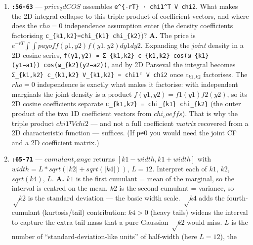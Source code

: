 \documentclass[
  11pt,
]{article}
\begin{document}
\begin{enumerate}
  strike couple \(y1\) and \(y2\) \emph{non-separably}: the region where
  the basket exceeds \(K\) is a diagonal half-plane
  \({w1 g1(y1)+w2 g2(y2) > K}\), not a product of intervals, so the 2D
  integral does not factor into a product of 1D integrals and has no
  elementary antiderivative. Hence line 49 builds the payoff on a dense
  grid \(P\) and lines 52--54 apply 2D trapezoidal quadrature written as
  \(C1ᵀ P C2\), where \(C1, C2\) are the cosine matrices times the
  trapezoidal weights \((Wy·h)\). It is the strike \(K\) inside the
  joint \(max\) that couples the two states.
\item
  \textbf{\texttt{:56-63}} --- \(price_2dCOS\) assembles
  \texttt{e\^{}\{-rT\}\ ·\ chi1\^{}T\ V\ chi2}. What makes the 2D
  integral collapse to this triple product of coefficient vectors, and
  where does the \(rho=0\) independence assumption enter (the density
  coefficients factorising
  \texttt{c\_\{k1,k2\}=chi\_\{k1\}\ chi\_\{k2\}})? \textbf{A.} The price
  is \(e^{−rT} ∫∫ payoff(y1,y2) f(y1,y2) dy1 dy2\). Expanding the
  \emph{joint} density in a 2D cosine series,
  \texttt{f(y1,y2)\ ≈\ Σ\_\{k1,k2\}\ c\_\{k1,k2\}\ cos(ω\_\{k1\}(y1−a1))\ cos(ω\_\{k2\}(y2−a2))},
  and by 2D Parseval the integral becomes
  \texttt{Σ\_\{k1,k2\}\ c\_\{k1,k2\}\ V\_\{k1,k2\}\ =\ chi1ᵀ\ V\ chi2}
  once \(c_{k1,k2}\) factorises. The \(rho=0\) independence is exactly
  what makes it factorise: with independent marginals the joint density
  is a product \(f(y1,y2)=f1(y1)f2(y2)\), so its 2D cosine coefficients
  separate \texttt{c\_\{k1,k2\}\ =\ chi\_\{k1\}\ chi\_\{k2\}} (the outer
  product of the two 1D coefficient vectors from \(chi_coeffs\)). That
  is why the triple product \(chi1ᵀ V chi2\) --- and not a full
  coefficient \emph{matrix} recovered from a 2D characteristic function
  --- suffices. (If ρ≠0 you would need the joint CF and a 2D coefficient
  matrix.)
\item
  \textbf{\texttt{:65-71}} --- \(cumulant_range\) returns
  \([k1 - width, k1 + width]\) with
  \(width = L*sqrt(|k2| + sqrt(|k4|))\), \(L=12\). Interpret each of
  \(k1\), \(k2\), \(sqrt(k4)\), \(L\). \textbf{A.} \(k1\) is the first
  cumulant = mean of the marginal, so the interval is centred on the
  mean. \(k2\) is the second cumulant = variance, so \(√k2\) is the
  standard deviation --- the basic width scale. \(√k4\) adds the
  fourth-cumulant (kurtosis/tail) contribution: \(k4>0\) (heavy tails)
  widens the interval to capture the extra tail mass that a
  pure-Gaussian \(√k2\) would miss. \(L\) is the number of
  ``standard-deviation-like units'' of half-width (here \(L=12\)), the

\end{enumerate}
\end{document}
